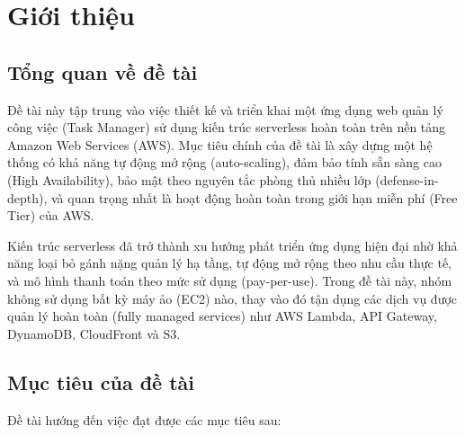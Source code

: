 \section{Giới thiệu}
\label{sec:introduction}

\subsection{Tổng quan về đề tài}
\label{ssec:overview}

Đề tài này tập trung vào việc thiết kế và triển khai một ứng dụng web quản lý công việc (Task Manager) sử dụng kiến trúc serverless hoàn toàn trên nền tảng Amazon Web Services (AWS). Mục tiêu chính của đề tài là xây dựng một hệ thống có khả năng tự động mở rộng (auto-scaling), đảm bảo tính sẵn sàng cao (High Availability), bảo mật theo nguyên tắc phòng thủ nhiều lớp (defense-in-depth), và quan trọng nhất là hoạt động hoàn toàn trong giới hạn miễn phí (Free Tier) của AWS.

Kiến trúc serverless đã trở thành xu hướng phát triển ứng dụng hiện đại nhờ khả năng loại bỏ gánh nặng quản lý hạ tầng, tự động mở rộng theo nhu cầu thực tế, và mô hình thanh toán theo mức sử dụng (pay-per-use). Trong đề tài này, nhóm không sử dụng bất kỳ máy ảo (EC2) nào, thay vào đó tận dụng các dịch vụ được quản lý hoàn toàn (fully managed services) như AWS Lambda, API Gateway, DynamoDB, CloudFront và S3.

\subsection{Mục tiêu của đề tài}
\label{ssec:objectives}

Đề tài hướng đến việc đạt được các mục tiêu sau:

